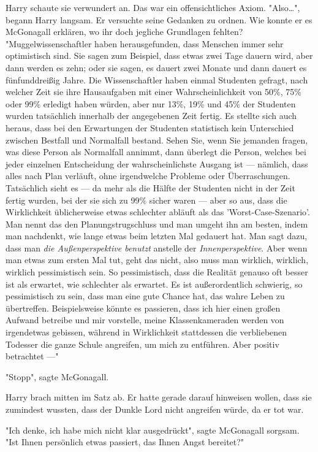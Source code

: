 {Harry schaute sie verwundert an. Das war ein offensichtliches Axiom. "Also…", begann Harry langsam. Er versuchte seine Gedanken zu ordnen. Wie konnte er es McGonagall erklären, wo ihr doch jegliche Grundlagen fehlten? "Muggelwissenschaftler haben herausgefunden, dass Menschen immer sehr optimistisch sind. Sie sagen zum Beispiel, dass etwas zwei Tage dauern wird, aber dann werden es zehn; oder sie sagen, es dauert zwei Monate und dann dauert es fünfunddreißig Jahre. Die Wissenschaftler haben einmal Studenten gefragt, nach welcher Zeit sie ihre Hausaufgaben mit einer Wahrscheinlichkeit von 50\%, 75\% oder 99\% erledigt haben würden, aber nur 13\%, 19\% und 45\% der Studenten wurden tatsächlich innerhalb der angegebenen Zeit fertig. Es stellte sich auch heraus, dass bei den Erwartungen der Studenten statistisch kein Unterschied zwischen Bestfall und Normalfall bestand. Sehen Sie, wenn Sie jemanden fragen, was diese Person als Normalfall annimmt, dann überlegt die Person, welches bei jeder einzelnen Entscheidung der wahrscheinlichste Ausgang ist --- nämlich, dass alles nach Plan verläuft, ohne irgendwelche Probleme oder Überraschungen. Tatsächlich sieht es --- da mehr als die Hälfte der Studenten nicht in der Zeit fertig wurden, bei der sie sich zu 99\% sicher waren --- aber so aus, dass die Wirklichkeit üblicherweise etwas schlechter abläuft als das 'Worst-Case-Szenario'. Man nennt das den Planungstrugschluss und man umgeht ihn am besten, indem man nachdenkt, wie lange etwas beim letzten Mal gedauert hat. Man sagt dazu, dass man \emph{die Außenperspektive benutzt} anstelle der \emph{Innenperspektive}. Aber wenn man etwas zum ersten Mal tut, geht das nicht, also muss man wirklich, wirklich, wirklich pessimistisch sein. So pessimistisch, dass die Realität genauso oft besser ist als erwartet, wie schlechter als erwartet. Es ist außerordentlich schwierig, so pessimistisch zu sein, dass man eine gute Chance hat, das wahre Leben zu übertreffen. Beispielsweise könnte es passieren, dass ich hier einen großen Aufwand betreibe und mir vorstelle, meine Klassenkameraden werden von irgendetwas gebissen, während in Wirklichkeit stattdessen die verbliebenen Todesser die ganze Schule angreifen, um mich zu entführen. Aber positiv betrachtet ---"

"Stopp", sagte McGonagall.

Harry brach mitten im Satz ab. Er hatte gerade darauf hinweisen wollen, dass sie zumindest wussten, dass der Dunkle Lord nicht angreifen würde, da er tot war.

"Ich denke, ich habe mich nicht klar ausgedrückt", sagte McGonagall sorgsam. "Ist Ihnen persönlich etwas passiert, das Ihnen Angst bereitet?"

}

